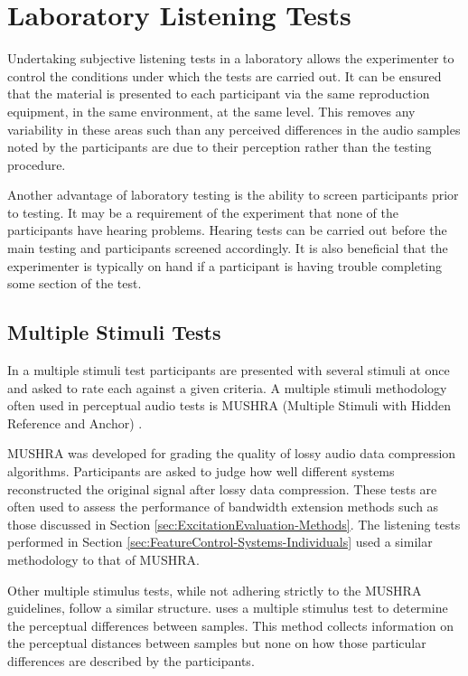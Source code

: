 \section{Laboratory Listening Tests}
\label{sec:Timbre-LaboratoryListeningTests}
	Undertaking subjective listening tests in a laboratory allows the experimenter to control the conditions under which
	the tests are carried out. It can be ensured that the material is presented to each participant via the same
	reproduction equipment, in the same environment, at the same level. This removes any variability in these areas such
	than any perceived differences in the audio samples noted by the participants are due to their perception rather
	than the testing procedure.

	Another advantage of laboratory testing is the ability to screen participants prior to testing. It may be a
	requirement of the experiment that none of the participants have hearing problems. Hearing tests can be carried out
	before the main testing and participants screened accordingly. It is also beneficial that the experimenter is
	typically on hand if a participant is having trouble completing some section of the test.

	\subsection{Multiple Stimuli Tests}
        \label{sec:Timbre-LaboratoryListeningTests-MultipleStimuliTests} 
		In a multiple stimuli test participants are presented with several stimuli at once and asked to rate each
		against a given criteria. A multiple stimuli methodology often used in perceptual audio tests is MUSHRA
		(Multiple Stimuli with Hidden Reference and Anchor) \citep{mushra2014}. 

		MUSHRA was developed for grading the quality of lossy audio data compression algorithms. Participants are
		asked to judge how well different systems reconstructed the original signal after lossy data compression.
		These tests are often used to assess the performance of bandwidth extension methods such as those discussed
		in Section \ref{sec:ExcitationEvaluation-Methods}. The listening tests performed in Section
		\ref{sec:FeatureControl-Systems-Individuals} used a similar methodology to that of MUSHRA.

		Other multiple stimulus tests, while not adhering strictly to the MUSHRA guidelines, follow a similar
		structure. \citet{arthi2015influence} uses a multiple stimulus test to determine the perceptual differences
		between samples. This method collects information on the perceptual distances between samples but none on
		how those particular differences are described by the participants.

